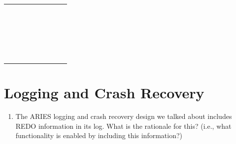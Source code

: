 \documentclass{article}
\begin{document}
\begin{enumerate}
\begin{changemargin}{-0.5in}{0.5in}
\begin{tabular}{|c|c|c|c|c|c|c|c|}
  & & & & & & & \\
  & & & & & & & \\
\hline
  & & & & & & & \\
  & & & & & & & \\
  & & & & & & & \\
\hline
  & & & & & & & \\
  & & & & & & & \\
  & & & & & & & \\
\hline
  & & & & & & & \\
  & & & & & & & \\
  & & & & & & & \\
\hline
  & & & & & & & \\
  & & & & & & & \\
  & & & & & & & \\
\hline
  & & & & & & & \\
  & & & & & & & \\
  & & & & & & & \\
\hline
  & & & & & & & \\
  & & & & & & & \\
  & & & & & & & \\
\hline
\end{tabular}
\end{changemargin}
\end{enumerate}


\section{Logging and Crash Recovery}
\begin{enumerate}
\item The ARIES logging and crash recovery design we talked about includes REDO
information in its log.  What is the rationale for this? (i.e., what
functionality is enabled by including this information?) 
\end{enumerate}

\end{document}
